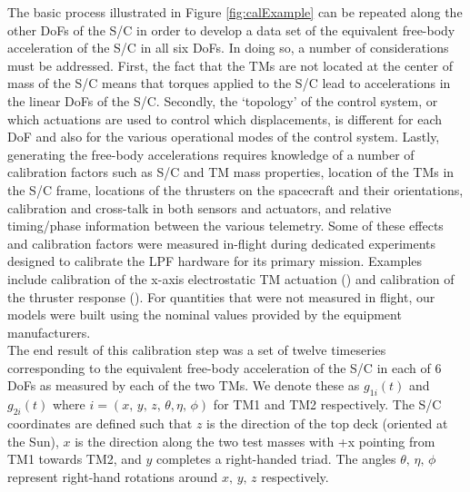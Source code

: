 \documentclass[twocolumn, trackchanges]{aastex62}
\newcommand{\red}[1]{\textcolor{red}{#1}}
\begin{document}
The basic process illustrated in Figure \ref{fig:calExample} can be repeated along the other DoFs of the S/C in order to develop a data set of the equivalent free-body acceleration of the S/C in all six DoFs. In doing so, a number of considerations must be addressed. First, the fact that the TMs are not located at the center of mass of the S/C means that torques applied to the S/C lead to accelerations in the linear DoFs of the S/C.  Secondly, the `topology' of the control system, or which actuations are used to control which displacements, is different for each DoF and also for the various operational modes of the control system. Lastly, generating the free-body accelerations requires knowledge of a number of calibration factors such as S/C and TM mass properties, location of the TMs in the S/C frame, locations of the thrusters on the spacecraft and their orientations, calibration and cross-talk in both sensors and actuators, and relative timing/phase information between the various telemetry.  Some of these effects and calibration factors were measured in-flight during dedicated experiments designed to calibrate the LPF hardware for its primary mission. Examples include calibration of the x-axis electrostatic TM actuation (\cite{LPF_Calibration}) and calibration of the thruster response (\cite{ST7_Results}). For quantities that were not measured in flight, our models were built using the nominal values provided by the equipment manufacturers. 
\\
The end result of this calibration step was a set of twelve timeseries corresponding to the equivalent free-body acceleration of the S/C in each of 6 DoFs as measured by each of the two TMs. We denote these as $g_{1i}(t)$ and $g_{2i}(t)$ where $i=\left(x,\,y,\,z,\,\theta,\eta,\,\phi\right)$ for TM1 and TM2 respectively. The S/C coordinates are defined such that $z$ is the direction of the top deck (oriented at the Sun), $x$ is the direction along the two test masses with +x pointing from TM1 towards TM2, and $y$ completes a right-handed triad. The angles $\theta,\,\eta,\,\phi$ represent right-hand rotations around $x,\,y,\,z$ respectively.
\end{document}
